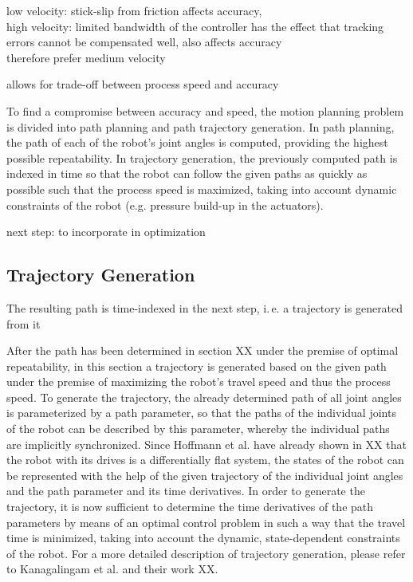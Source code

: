 \documentclass[5p,times,procedia]{elsarticle}
\begin{document}
low velocity: stick-slip from friction affects accuracy,\\
high velocity: limited bandwidth of the controller has the effect that tracking errors cannot be compensated well, also affects accuracy \\
therefore prefer medium velocity

allows for trade-off between process speed and accuracy

To find a compromise between accuracy and speed, the motion planning problem is divided into path planning and path trajectory generation. In path planning, the path of each of the robot's joint angles is computed, providing the highest possible repeatability. In trajectory generation, the previously computed path is indexed in time so that the robot can follow the given paths as quickly as possible such that the process speed is maximized, taking into account dynamic constraints of the robot (e.g. pressure build-up in the actuators).


next step: to incorporate in optimization

\subsection{Trajectory Generation}



The resulting path is time-indexed in the next step, i.\,e. a trajectory is generated from it

After the path has been determined in section XX under the premise of optimal repeatability, in this section a trajectory is generated based on the given path under the premise of maximizing the robot's travel speed and thus the process speed. To generate the trajectory, the already determined path of all joint angles is parameterized by a path parameter, so that the paths of the individual joints of the robot can be described by this parameter, whereby the individual paths are implicitly synchronized. Since Hoffmann et al. have already shown in XX that the robot with its drives is a differentially flat system, the states of the robot can be represented with the help of the given trajectory of the individual joint angles and the path parameter and its time derivatives. In order to generate the trajectory, it is now sufficient to determine the time derivatives of the path parameters by means of an optimal control problem in such a way that the travel time is minimized, taking into account the dynamic, state-dependent constraints of the robot.  For a more detailed description of trajectory generation, please refer to Kanagalingam et al. and their work XX.  
\end{document}

